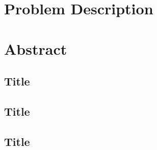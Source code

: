





\begin{preface}
\chapter*{Problem Description}
\chapter*{Abstract}
\overview
\figures
\tables
\end{preface}

\begin{content}
\chapter{Title}
\section{Title}
\cite{hockney1994}
\end{content}

\begin{appendices}
\chapter{}
\section{Title}
\end{appendices}


